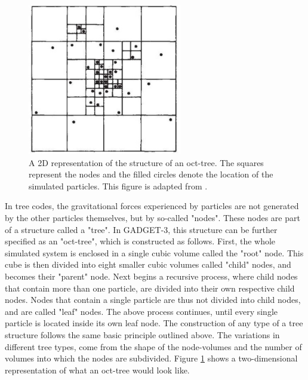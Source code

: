 \documentclass[english, twoside]{HYgradu}
\begin{document}
\begin{figure}
	\centering	
	\includegraphics[width=0.6\textwidth]{barnes_octtree.png}	
	\caption{A 2D representation of the structure of an oct-tree. The squares represent the nodes and the filled circles denote the location of the simulated particles. This figure is adapted from \cite{Barnes1986}.}
	\label{figure:oct_tree}
\end{figure}

In tree codes, the gravitational forces experienced by particles are not generated by the other particles themselves, but by so-called "nodes". These nodes are part of a structure called a "tree". In GADGET-3, this structure can be further specified as an "oct-tree", which is constructed as follows. First, the whole simulated system is enclosed in a single cubic volume called the "root" node. This cube is then divided into eight smaller cubic volumes called "child" nodes, and becomes their "parent" node. Next begins a recursive process, where child nodes that contain more than one particle, are divided into their own respective child nodes. Nodes that contain a single particle are thus not divided into child nodes, and are called "leaf" nodes. The above process continues, until every single particle is located inside its own leaf node. The construction of any type of a tree structure follows the same basic principle outlined above. The variations in different tree types, come from the shape of the node-volumes and the number of volumes into which the nodes are subdivided. Figure \ref{figure:oct_tree} shows a two-dimensional representation of what an oct-tree would look like. 
\end{document}
